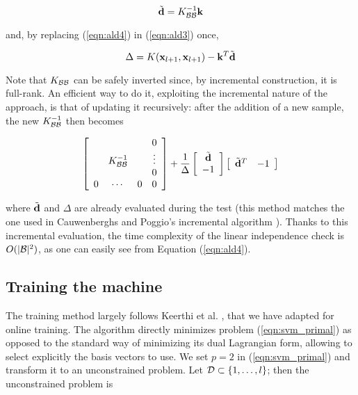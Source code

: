 \begin{equation} \label{eqn:ald4}
  \tilde{\mathbf{d}} = K_{\mathcal{B}\mathcal{B}}^{-1} \mathbf{k} \\
\end{equation}

\noindent and, by replacing (\ref{eqn:ald4}) in (\ref{eqn:ald3}) once,

\begin{equation} \label{eqn:ald5}
  \Delta = K(\mathbf{x}_{l+1},\mathbf{x}_{l+1}) - \mathbf{k}^T \tilde{\mathbf{d}}
\end{equation}

Note that $K_{\mathcal{B}\mathcal{B}}$ can be safely inverted since, by incremental
construction, it is full-rank. An efficient way to do it, exploiting
the incremental nature of the approach, is that of updating it
recursively: after the addition of a new sample, the new
$K_{\mathcal{B}\mathcal{B}}^{-1}$ then becomes

\begin{equation} \label{eqn:inv_upd}
  \left[\begin{array}{cccc}
       &               &   & 0 \\
       & K_{\mathcal{B}\mathcal{B}}^{-1} &   & \vdots \\
       &               &   & 0 \\
     0 &       \cdots  & 0 & 0
  \end{array}\right]
  +
  \frac{1}{\Delta}
  \left[\begin{array}{c}
    \tilde{\mathbf{d}} \\
    -1
  \end{array}\right]
  \left[\begin{array}{cc}
    \tilde{\mathbf{d}}^T & -1
  \end{array}\right]
\end{equation}

\noindent where $\tilde{\mathbf{d}}$ and $\Delta$ are already evaluated during the
test (this method matches the one used in Cauwenberghs and Poggio's
incremental algorithm \cite{CauwenberghsP00}). Thanks to this
incremental evaluation, the time complexity of the linear independence
check is $O(|\mathcal{B}|^2)$, as one can easily see from Equation
(\ref{eqn:ald4}).

\subsection{Training the machine}

The training method largely follows Keerthi et
al. \cite{KeerthiDC05,KeerthiCDC06}, that we have adapted for online
training. The algorithm directly minimizes problem
(\ref{eqn:svm_primal}) as opposed to the standard way of minimizing
its dual Lagrangian form, allowing to select explicitly the basis
vectors to use. We set $p=2$ in (\ref{eqn:svm_primal}) and transform
it to an unconstrained problem.  Let $\mathcal{D} \subset \{1,\ldots,l\}$; then
the unconstrained problem is

